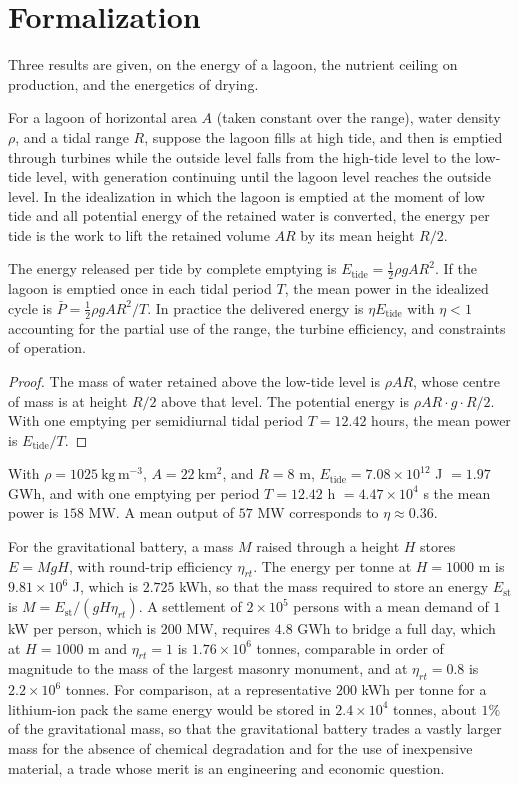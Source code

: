 \section*{Formalization}

Three results are given, on the energy of a lagoon, the nutrient ceiling on production, and the energetics of drying.

For a lagoon of horizontal area $A$ (taken constant over the range), water density $\rho$, and a tidal range $R$, suppose the lagoon fills at high tide, and then is emptied through turbines while the outside level falls from the high-tide level to the low-tide level, with generation continuing until the lagoon level reaches the outside level. In the idealization in which the lagoon is emptied at the moment of low tide and all potential energy of the retained water is converted, the energy per tide is the work to lift the retained volume $AR$ by its mean height $R/2$.

\begin{proposition}
The energy released per tide by complete emptying is $E_{\mathrm{tide}}=\tfrac12\rho gAR^2$. If the lagoon is emptied once in each tidal period $T$, the mean power in the idealized cycle is $\bar P=\tfrac12\rho gAR^2/T$. In practice the delivered energy is $\eta E_{\mathrm{tide}}$ with $\eta<1$ accounting for the partial use of the range, the turbine efficiency, and constraints of operation.
\end{proposition}

\begin{proof}
The mass of water retained above the low-tide level is $\rho AR$, whose centre of mass is at height $R/2$ above that level. The potential energy is $\rho AR\cdot g\cdot R/2$. With one emptying per semidiurnal tidal period $T=12.42$ hours, the mean power is $E_{\mathrm{tide}}/T$.
\end{proof}

With $\rho=1025\ \mathrm{kg\,m^{-3}}$, $A=22\ \mathrm{km^2}$, and $R=8$ m, $E_{\mathrm{tide}}=7.08\times10^{12}$ J $=1.97$ GWh, and with one emptying per period $T=12.42$ h $=4.47\times10^4$ s the mean power is $158$ MW. A mean output of $57$ MW corresponds to $\eta\approx0.36$.

For the gravitational battery, a mass $M$ raised through a height $H$ stores $E=MgH$, with round-trip efficiency $\eta_{rt}$. The energy per tonne at $H=1000$ m is $9.81\times10^{6}$ J, which is $2.725$ kWh, so that the mass required to store an energy $E_{\mathrm{st}}$ is $M=E_{\mathrm{st}}/(gH\eta_{rt})$. A settlement of $2\times10^5$ persons with a mean demand of $1$ kW per person, which is $200$ MW, requires $4.8$ GWh to bridge a full day, which at $H=1000$ m and $\eta_{rt}=1$ is $1.76\times10^6$ tonnes, comparable in order of magnitude to the mass of the largest masonry monument, and at $\eta_{rt}=0.8$ is $2.2\times10^6$ tonnes. For comparison, at a representative $200$ kWh per tonne for a lithium-ion pack the same energy would be stored in $2.4\times10^4$ tonnes, about $1\%$ of the gravitational mass, so that the gravitational battery trades a vastly larger mass for the absence of chemical degradation and for the use of inexpensive material, a trade whose merit is an engineering and economic question.


